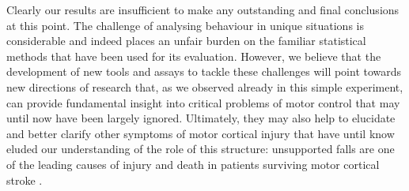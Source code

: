 Clearly our results are insufficient to make any outstanding and final conclusions at this point. The challenge of analysing behaviour in unique situations is considerable and indeed places an unfair burden on the familiar statistical methods that have been used for its evaluation. However, we believe that the development of new tools and assays to tackle these challenges will point towards new directions of research that, as we observed already in this simple experiment, can provide fundamental insight into critical problems of motor control that may until now have been largely ignored. Ultimately, they may also help to elucidate and better clarify other symptoms of motor cortical injury that have until know eluded our understanding of the role of this structure: unsupported falls are one of the leading causes of injury and death in patients surviving motor cortical stroke \cite{Jacobs2014}.

